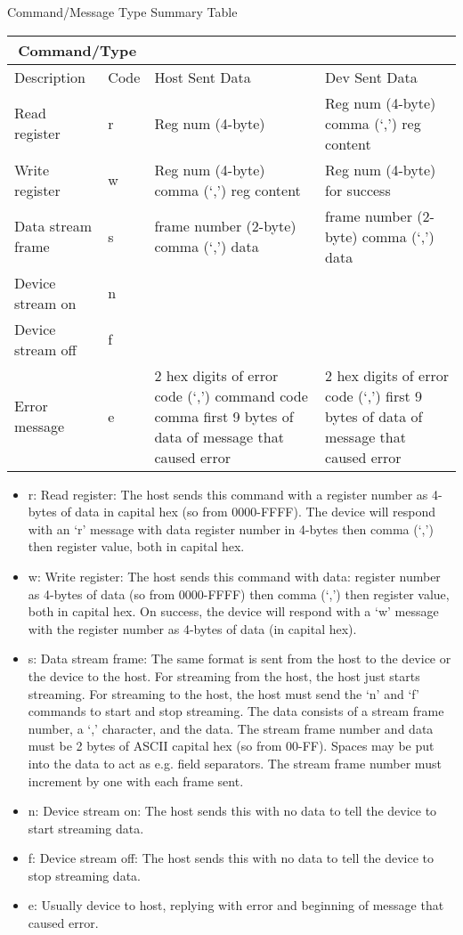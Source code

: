 \documentclass{customdocclass}
\begin{document}
\begin{center}
\small
Command/Message Type Summary Table
\begin{tabularx}{\textwidth}{|X|l|X|X|} \hline
\multicolumn{2}{|c|}{Command/Type} & & \\ \hline
Description & Code & Host Sent Data & Dev Sent Data \\ \hline
Read register & r & Reg num (4-byte) & Reg num (4-byte) comma (`,') reg content \\ \hline
Write register & w & Reg num (4-byte) comma (`,') reg content & Reg num (4-byte) for success \\ \hline
Data stream frame & s & frame number (2-byte) comma (`,') data &  frame number (2-byte) comma (`,') data \\ \hline
Device stream on & n & & \\ \hline
Device stream off & f & & \\ \hline
Error message & e & 2 hex digits of error code (`,') command code comma first 9 bytes of data of message that caused error &  2 hex digits of error code (`,') first 9 bytes of data of message that caused error \\ \hline
\end{tabularx}
\end{center}

\begin{itemize}
  \item r: Read register: The host sends this command with a register number as 4-bytes of data in capital hex (so from 0000-FFFF). The device will respond with an `r' message with data register number in 4-bytes then comma (`,') then register value, both in capital hex.
  \item w: Write register: The host sends this command with data: register number as 4-bytes of data (so from 0000-FFFF) then comma (`,') then register value, both in capital hex. On success, the device will respond with a `w' message with the register number as 4-bytes of data (in capital hex).
  \item s: Data stream frame: The same format is sent from the host to the device or the device to the host. For streaming from the host, the host just starts streaming. For streaming to the host, the host must send the `n' and `f' commands to start and stop streaming. The data consists of a stream frame number, a `,' character, and the data. The stream frame number and data must be 2 bytes of ASCII capital hex (so from 00-FF). Spaces may be put into the data to act as e.g. field separators. The stream frame number must increment by one with each frame sent.
  \item n: Device stream on: The host sends this with no data to tell the device to start streaming data.
  \item f: Device stream off: The host sends this with no data to tell the device to stop streaming data.
  \item e: Usually device to host, replying with error and beginning of message that caused error.
\end{itemize}
\end{document}
